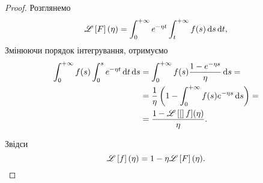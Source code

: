 \begin{proof}
        
        

    Розглянемо
    \begin{equation}
        \mathscr{L}\left[F\right](\eta) = \int_0^{+\infty} e^{-\eta t} \int_t^{+\infty} f(s) \mathop{}\!\mathrm{d} s \mathop{}\!\mathrm{d} t,
    \end{equation}
    Змінюючи порядок інтегрування, отримуємо
    \begin{equation}
        \begin{aligned}
            \int_0^{+\infty} f(s) \int_0^s e^{-\eta t} \mathop{}\!\mathrm{d} t \mathop{}\!\mathrm{d} s
            &= \int_0^{+\infty} f(s) \frac{1 - e^{-\eta s}}{\eta} \mathop{}\!\mathrm{d} s = \\
            &= \frac{1}{\eta} \left( 1 - \int_0^{+\infty} f(s) e^{-\eta s} \mathop{}\!\mathrm{d} s \right) = \\
            &= \frac{1 - \mathscr{L}\left[[\right]f](\eta)}{\eta}.
        \end{aligned}
    \end{equation}

    Звідси
    \begin{equation}
        \mathscr{L}\left[f\right](\eta) = 1 - \eta \mathscr{L}\left[F\right](\eta).
    \end{equation}


\end{proof}
